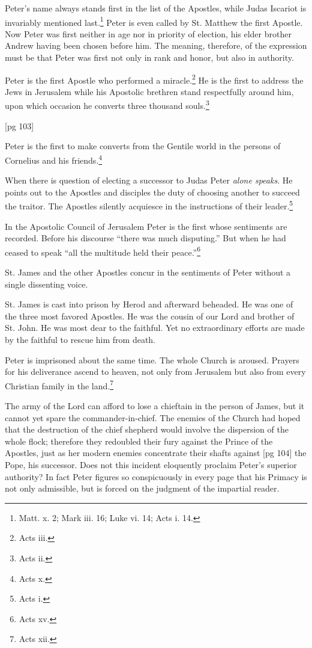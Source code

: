 Peter's name always stands first in the list of
the Apostles, while Judas Iscariot is invariably
mentioned last.\footnote{Matt. x. 2; Mark
iii. 16; Luke vi. 14; Acts i. 14.} Peter is even called by St.
Matthew the first Apostle. Now Peter was first
neither in age nor in priority of election, his elder
brother Andrew having been chosen before him.
The meaning, therefore, of the expression must
be that Peter was first not only in rank and honor,
but also in authority.

Peter is the first Apostle who performed a miracle.\footnote{Acts iii.}
He is the first to address the Jews in Jerusalem
while his Apostolic brethren stand respectfully
around him, upon which occasion he converts
three thousand souls.\footnote{Acts ii.}

[pg 103]

Peter is the first to make converts from the
Gentile world in the persons of Cornelius and his
friends.\footnote{Acts x.}

When there is question of electing a successor
to Judas Peter \emph{alone speaks}. He points out to
the Apostles and disciples the duty of choosing
another to succeed the traitor. The Apostles silently
acquiesce in the instructions of their leader.\footnote{Acts i.}

In the Apostolic Council of Jerusalem Peter is
the first whose sentiments are recorded. Before
his discourse “there was much disputing.” But
when he had ceased to speak “all the multitude
held their peace.”\footnote{Acts xv.}

St. James and the other Apostles concur in the
sentiments of Peter without a single dissenting
voice.

St. James is cast into prison by Herod and afterward
beheaded. He was one of the three most
favored Apostles. He was the cousin of our Lord
and brother of St. John. He was most dear to
the faithful. Yet no extraordinary efforts are
made by the faithful to rescue him from death.

Peter is imprisoned about the same time. The
whole Church is aroused. Prayers for his deliverance
ascend to heaven, not only from Jerusalem
but also from every Christian family in the
land.\footnote{Acts xii.}

The army of the Lord can afford to lose a chieftain
in the person of James, but it cannot yet
spare the commander-in-chief. The enemies of the
Church had hoped that the destruction of the chief
shepherd would involve the dispersion of the
whole flock; therefore they redoubled their fury
against the Prince of the Apostles, just as her
modern enemies concentrate their shafts against
[pg 104]
the Pope, his successor. Does not this incident
eloquently proclaim Peter's superior authority?
In fact Peter figures so conspicuously in every
page that his Primacy is not only admissible, but
is forced on the judgment of the impartial reader.

